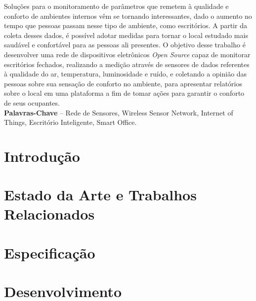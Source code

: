 \documentclass[]{politex}
\begin{document}
\capa

\falsafolhaderosto

\folhaderosto



\begin{resumo}
Soluções para o monitoramento de parâmetros que remetem à qualidade e conforto de ambientes internos vêm se tornando interessantes, dado o aumento no tempo que pessoas passam nesse tipo de ambiente, como escritórios. A partir da coleta desses dados, é possível adotar medidas para tornar o local estudado mais saudável e confortável para as pessoas ali presentes. O objetivo desse trabalho é desenvolver uma rede de dispositivos eletrônicos \textit{Open Source} capaz de monitorar escritórios fechados, realizando a medição através de sensores de dados referentes à qualidade do ar, temperatura, luminosidade e ruído, e coletando a opinião das pessoas sobre sua sensação de conforto no ambiente, para apresentar relatórios sobre o local em uma plataforma a fim de tomar ações para garantir o conforto de seus ocupantes. 
%
\\[3\baselineskip]
%
\textbf{Palavras-Chave} -- Rede de Sensores, Wireless Sensor Network, Internet of Things, Escritório Inteligente, Smart Office.
\end{resumo}



\sumario


\chapter{Introdução} \label{cap:introducao}


\chapter{Estado da Arte e Trabalhos Relacionados} \label{cap:arte} %


\chapter{Especificação}


\chapter{Desenvolvimento}

\end{document}
